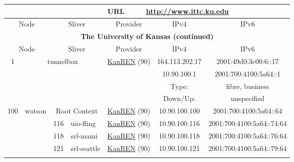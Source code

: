 \begin{small}
\begin{center}
\begin{longtable}{|c|c|c|c|c|c|c|c|}
 \multicolumn{4}{|c|}{} & \multicolumn{1}{|l|}{URL} & \multicolumn{3}{|l|}{\url{http://www.ittc.ku.edu}} \\ \hline
 \multicolumn{2}{|p{8em}|}{Node} & \multicolumn{2}{|p{8em}|}{Sliver} & \multicolumn{2}{|p{8em}|}{Provider} & IPv4 & IPv6 \\ \hline
\endfirsthead
\hline
 \multicolumn{8}{|c|}{\textbf{The University of Kansas (continued)}} \\ \hline
 \multicolumn{2}{|p{8em}|}{Node} & \multicolumn{2}{|p{8em}|}{Sliver} & \multicolumn{2}{|p{8em}|}{Provider} & IPv4 & IPv6 \\ \hline
\endhead
 \multirow{4}{*}{\tiny{1}} & \multicolumn{3}{|c|}{\multirow{4}{*}{\tiny{tunnelbox}}} & \multicolumn{2}{|c|}{\multirow{4}{*}{\tiny{\href{http://www.kanren.net}{KanREN} (90)}}} & \tiny{164.113.202.17} & \tiny{2001:49d0:3c00:6::17} \\* \cline{7-7}\cline{8-8}
  & \multicolumn{3}{|c|}{} & \multicolumn{2}{|c|}{} & \tiny{10.90.100.1} & \tiny{2001:700:4100:5a64::1} \\* \cline{7-7}\cline{8-8}
  & \multicolumn{3}{|c|}{} & \multicolumn{2}{|c|}{} & Type: & fibre, business \\* \cline{7-7}\cline{8-8}
  & \multicolumn{3}{|c|}{} & \multicolumn{2}{|c|}{} & Down/Up:  & unspecified \\ \hline
 \multirow{29}{*}{\tiny{100}} & \multicolumn{1}{|l|}{\multirow{29}{*}{\tiny{watson}}} & \multicolumn{2}{|c|}{\tiny{Root Context}} & \multicolumn{2}{|c|}{\tiny{\href{http://www.kanren.net}{KanREN} (90)}} & \tiny{10.90.100.100} & \tiny{2001:700:4100:5a64::64} \\* \cline{3-3}\cline{4-4}\cline{5-5}\cline{6-6}\cline{7-7}\cline{8-8}
  &  & \tiny{116} & \multicolumn{1}{|l|}{\tiny{uio-fling}} & \multicolumn{2}{|c|}{\tiny{\href{http://www.kanren.net}{KanREN} (90)}} & \tiny{10.90.100.116} & \tiny{2001:700:4100:5a64::74:64} \\* \cline{3-3}\cline{4-4}\cline{5-5}\cline{6-6}\cline{7-7}\cline{8-8}
  &  & \tiny{118} & \multicolumn{1}{|l|}{\tiny{srl-mami}} & \multicolumn{2}{|c|}{\tiny{\href{http://www.kanren.net}{KanREN} (90)}} & \tiny{10.90.100.118} & \tiny{2001:700:4100:5a64::76:64} \\* \cline{3-3}\cline{4-4}\cline{5-5}\cline{6-6}\cline{7-7}\cline{8-8}
  &  & \tiny{121} & \multicolumn{1}{|l|}{\tiny{srl-seattle}} & \multicolumn{2}{|c|}{\tiny{\href{http://www.kanren.net}{KanREN} (90)}} & \tiny{10.90.100.121} & \tiny{2001:700:4100:5a64::79:64} \\* \cline{3-3}\cline{4-4}\cline{5-5}\cline{6-6}\cline{7-7}\cline{8-8}

\end{longtable}
\end{center}
\end{small}
